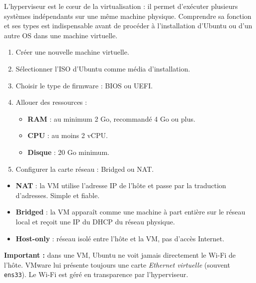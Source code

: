 \documentclass[11pt,a4paper]{article}
\begin{document}
\begin{tcolorbox}[title={Conclusion}]
L’hyperviseur est le cœur de la virtualisation : il permet d’exécuter plusieurs systèmes indépendants sur une même machine physique.  
Comprendre sa fonction et ses types est indispensable avant de procéder à l’installation d’Ubuntu ou d’un autre OS dans une machine virtuelle.
\end{tcolorbox}







\begin{tcolorbox}[title={2. Création d’une VM dans VMware}]
\begin{enumerate}
  \item Créer une nouvelle machine virtuelle.  
  \item Sélectionner l’ISO d’Ubuntu comme média d’installation.  
  \item Choisir le type de firmware : BIOS ou UEFI.  
  \item Allouer des ressources :
    \begin{itemize}
      \item \textbf{RAM} : au minimum 2 Go, recommandé 4 Go ou plus.  
      \item \textbf{CPU} : au moins 2 vCPU.  
      \item \textbf{Disque} : 20 Go minimum.  
    \end{itemize}
  \item Configurer la carte réseau : Bridged ou NAT.
\end{enumerate}
\end{tcolorbox}

\begin{tcolorbox}[title={3. Modes Réseau en VM}]
\begin{itemize}
  \item \textbf{NAT} : la VM utilise l’adresse IP de l’hôte et passe par la traduction d’adresses. Simple et fiable.  
  \item \textbf{Bridged} : la VM apparaît comme une machine à part entière sur le réseau local et reçoit une IP du DHCP du réseau physique.  
  \item \textbf{Host-only} : réseau isolé entre l’hôte et la VM, pas d’accès Internet.
\end{itemize}

\textbf{Important :} dans une VM, Ubuntu ne voit jamais directement le Wi-Fi de l’hôte. VMware lui présente toujours une carte \emph{Ethernet virtuelle} (souvent \texttt{ens33}). Le Wi-Fi est géré en transparence par l’hyperviseur.
\end{tcolorbox}
\end{document}
